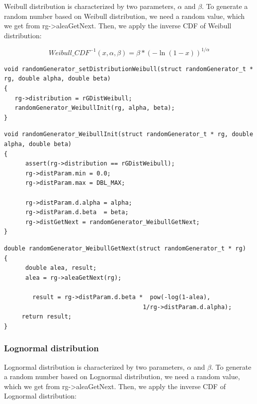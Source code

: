    Weibull distribution is characterized by two parameters, $\alpha$
and $\beta$. To generate a random number based on Weibull
distribution, we need a random value, which we get from
rg->aleaGetNext. Then, we apply the inverse CDF of Weibull
distribution: 

  $$Weibull\_CDF^{-1}(x,\alpha,\beta)=\beta*(-\ln(1-x))^{1/\alpha}$$

\begin{verbatim}
void randomGenerator_setDistributionWeibull(struct randomGenerator_t * rg, double alpha, double beta)
{
   rg->distribution = rGDistWeibull;
   randomGenerator_WeibullInit(rg, alpha, beta);
}
\end{verbatim}


\begin{verbatim}
void randomGenerator_WeibullInit(struct randomGenerator_t * rg, double alpha, double beta)
{
      assert(rg->distribution == rGDistWeibull);   
      rg->distParam.min = 0.0;
      rg->distParam.max = DBL_MAX;
  
      rg->distParam.d.alpha = alpha;
      rg->distParam.d.beta  = beta; 
      rg->distGetNext = randomGenerator_WeibullGetNext;
}
\end{verbatim}

\begin{verbatim}
double randomGenerator_WeibullGetNext(struct randomGenerator_t * rg)
{
      double alea, result;
      alea = rg->aleaGetNext(rg);

        result = rg->distParam.d.beta *  pow(-log(1-alea), 
                                       1/rg->distParam.d.alpha);
     return result;
}
\end{verbatim}

%
\subsubsection{Lognormal distribution}
\label{lognormal_dist}

Lognormal distribution is characterized by two parameters, $\alpha$ and $\beta$.
To generate a random number based on Lognormal distribution, we need a random value, which we get from rg->aleaGetNext. Then, we apply the inverse CDF of Lognormal distribution:


